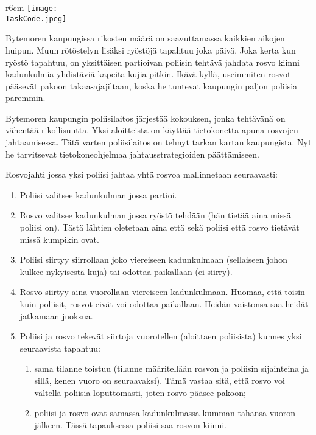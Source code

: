 \documentclass{boi2014-fi}
\renewcommand{\TaskCode}{coprobber}
\begin{document}
    \begin{wrapfigure}[8]{r}{6cm}
        \vspace{-24pt}
		\texttt{[image: \\TaskCode.jpeg]}
	\end{wrapfigure}
    
    Bytemoren kaupungissa rikosten määrä on saavuttamassa kaikkien aikojen
    huipun. Muun rötöstelyn lisäksi ryöstöjä tapahtuu joka päivä.
    Joka kerta kun ryöstö tapahtuu, on yksittäisen partioivan poliisin
    tehtävä jahdata rosvo kiinni kadunkulmia yhdistäviä kapeita kujia
    pitkin. Ikävä kyllä, useimmiten rosvot pääsevät pakoon takaa-ajajiltaan,
    koska he tuntevat kaupungin paljon poliisia paremmin.

    Bytemoren kaupungin poliisilaitos järjestää kokouksen, jonka tehtävänä
    on vähentää rikollisuutta. Yksi aloitteista on käyttää tietokonetta
    apuna rosvojen jahtaamisessa. Tätä varten poliisilaitos on tehnyt tarkan
    kartan kaupungista. Nyt he tarvitsevat tietokoneohjelmaa
    jahtausstrategioiden päättämiseen.
    
    Rosvojahti jossa yksi poliisi jahtaa yhtä rosvoa mallinnetaan seuraavasti:
    \begin{enumerate}
        \item Poliisi valitsee kadunkulman jossa partioi.
        \item Rosvo valitsee kadunkulman jossa ryöstö tehdään (hän tietää
            aina missä poliisi on). Tästä lähtien oletetaan aina että sekä
            poliisi että rosvo tietävät missä kumpikin ovat.
        \item Poliisi siirtyy siirrollaan joko viereiseen kadunkulmaan
            (sellaiseen johon kulkee nykyisestä kuja) tai odottaa paikallaan (ei siirry).
        \item Rosvo siirtyy aina vuorollaan viereiseen kadunkulmaan. Huomaa,
            että toisin kuin poliisit, rosvot eivät voi odottaa paikallaan.
            Heidän vaistonsa saa heidät jatkamaan juoksua.
        \item Poliisi ja rosvo tekevät siirtoja vuorotellen (aloittaen poliisista)
            kunnes yksi seuraavista tapahtuu:
        \begin{enumerate}
            \item sama tilanne toistuu (tilanne määritellään rosvon ja poliisin
                sijainteina ja sillä, kenen vuoro on seuraavaksi). Tämä vastaa
                sitä, että rosvo voi vältellä poliisia loputtomasti, joten
                rosvo pääsee pakoon;
            \item poliisi ja rosvo ovat samassa kadunkulmassa kumman tahansa
                vuoron jälkeen. Tässä tapauksessa poliisi saa rosvon kiinni.
        \end{enumerate}
    \end{enumerate}
\end{document}
